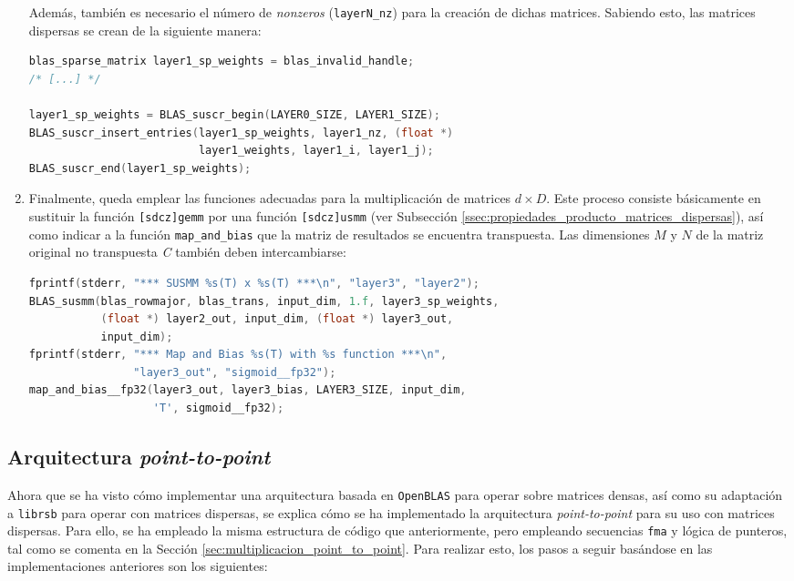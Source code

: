 \begin{enumerate}
    Además, también es necesario el número de \textit{nonzeros} (\texttt{layerN\_nz}) para la creación de dichas matrices. Sabiendo esto, las matrices dispersas se crean de la siguiente manera:\medskip
\begin{lstlisting}[language=C]
blas_sparse_matrix layer1_sp_weights = blas_invalid_handle;
/* [...] */

layer1_sp_weights = BLAS_suscr_begin(LAYER0_SIZE, LAYER1_SIZE);
BLAS_suscr_insert_entries(layer1_sp_weights, layer1_nz, (float *)
                          layer1_weights, layer1_i, layer1_j);
BLAS_suscr_end(layer1_sp_weights);
\end{lstlisting}

    \item Finalmente, queda emplear las funciones adecuadas para la multiplicación de matrices $d\times D$. Este proceso consiste básicamente en sustituir la función \texttt{[sdcz]gemm} por una función \texttt{[sdcz]usmm} (ver Subsección \ref{ssec:propiedades_producto_matrices_dispersas}), así como indicar a la función \texttt{map\_and\_bias} que la matriz de resultados se encuentra transpuesta. Las dimensiones $M$ y $N$ de la matriz original no transpuesta \textit{C} también deben intercambiarse:\medskip
\begin{lstlisting}[language=C]
fprintf(stderr, "*** SUSMM %s(T) x %s(T) ***\n", "layer3", "layer2");
BLAS_susmm(blas_rowmajor, blas_trans, input_dim, 1.f, layer3_sp_weights,
           (float *) layer2_out, input_dim, (float *) layer3_out,
           input_dim);
fprintf(stderr, "*** Map and Bias %s(T) with %s function ***\n",
                "layer3_out", "sigmoid__fp32");
map_and_bias__fp32(layer3_out, layer3_bias, LAYER3_SIZE, input_dim,
                   'T', sigmoid__fp32);
\end{lstlisting}
\end{enumerate}

\subsection{Arquitectura \textit{point-to-point}}
\label{ssec:gdin_arquitectura_point_to_point}
Ahora que se ha visto cómo implementar una arquitectura basada en \texttt{OpenBLAS} para operar sobre matrices densas, así como su adaptación a \texttt{librsb} para operar con matrices dispersas, se explica cómo se ha implementado la arquitectura \textit{point-to-point} para su uso con matrices dispersas. Para ello, se ha empleado la misma estructura de código que anteriormente, pero empleando secuencias \texttt{\acrshort{fma}} y lógica de punteros, tal como se comenta en la Sección \ref{sec:multiplicacion_point_to_point}. Para realizar esto, los pasos a seguir basándose en las implementaciones anteriores son los siguientes:

